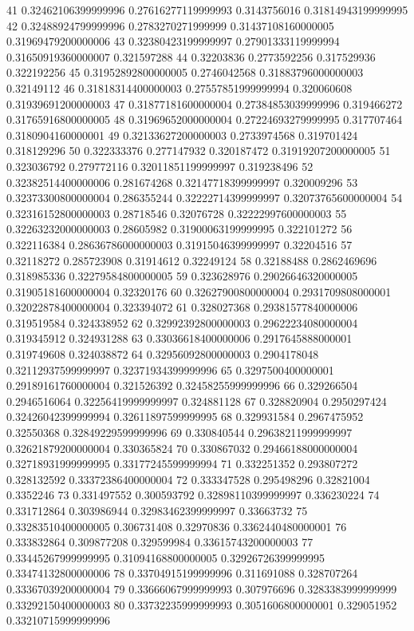 41 0.32462106399999996 0.27616277119999993 0.3143756016 0.31814943199999995
42 0.32488924799999996 0.2783270271999999 0.31437108160000005 0.31969479200000006
43 0.32380423199999997 0.27901333119999994 0.31650919360000007 0.321597288
44 0.32203836 0.2773592256 0.317529936 0.322192256
45 0.31952892800000005 0.2746042568 0.31883796000000003 0.32149112
46 0.31818314400000003 0.27557851999999994 0.320060608 0.31939691200000003
47 0.31877181600000004 0.27384853039999996 0.319466272 0.31765916800000005
48 0.31969652000000004 0.27224693279999995 0.317707464 0.3180904160000001
49 0.32133627200000003 0.2733974568 0.319701424 0.318129296
50 0.322333376 0.277147932 0.320187472 0.31919207200000005
51 0.323036792 0.279772116 0.32011851199999997 0.319238496
52 0.32382514400000006 0.281674268 0.32147718399999997 0.320009296
53 0.32373300800000004 0.286355244 0.32222714399999997 0.32073765600000004
54 0.32316152800000003 0.28718546 0.32076728 0.32222997600000003
55 0.32263232000000003 0.28605982 0.31900063199999995 0.322101272
56 0.322116384 0.28636786000000003 0.31915046399999997 0.32204516
57 0.32118272 0.285723908 0.31914612 0.32249124
58 0.32188488 0.2862469696 0.318985336 0.32279584800000005
59 0.323628976 0.29026646320000005 0.31905181600000004 0.32320176
60 0.32627900800000004 0.2931709808000001 0.32022878400000004 0.323394072
61 0.328027368 0.29381577840000006 0.319519584 0.324338952
62 0.32992392800000003 0.29622234080000004 0.319345912 0.324931288
63 0.33036618400000006 0.2917645888000001 0.319749608 0.324038872
64 0.32956092800000003 0.2904178048 0.32112937599999997 0.32371934399999996
65 0.3297500400000001 0.29189161760000004 0.321526392 0.32458255999999996
66 0.329266504 0.2946516064 0.32256419999999997 0.324881128
67 0.328820904 0.2950297424 0.32426042399999994 0.32611897599999995
68 0.329931584 0.2967475952 0.32550368 0.32849229599999996
69 0.330840544 0.29638211999999997 0.32621879200000004 0.330365824
70 0.330867032 0.29466188000000004 0.32718931999999995 0.33177245599999994
71 0.332251352 0.293807272 0.328132592 0.33372386400000004
72 0.333347528 0.295498296 0.32821004 0.3352246
73 0.331497552 0.300593792 0.32898110399999997 0.336230224
74 0.331712864 0.303986944 0.32983462399999997 0.33663732
75 0.33283510400000005 0.306731408 0.32970836 0.3362440480000001
76 0.333832864 0.309877208 0.329599984 0.33615743200000003
77 0.33445267999999995 0.31094168800000005 0.32926726399999995 0.33474132800000006
78 0.33704915199999996 0.311691088 0.328707264 0.33367039200000004
79 0.33666067999999993 0.307976696 0.3283383999999999 0.33292150400000003
80 0.33732235999999993 0.3051606800000001 0.329051952 0.33210715999999996
